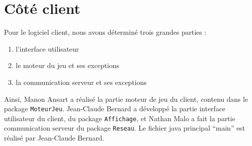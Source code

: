 \section{Côté client}
	Pour le logiciel client, nous avons déterminé trois grandes parties :
	\begin{enumerate}
		\item l'interface utilisateur
		\item le moteur du jeu et ses exceptions
		\item la communication serveur et ses exceptions
	\end{enumerate}

	Ainsi, Manon Ansart a réalisé la partie moteur de jeu du client, contenu dans le package \texttt{MoteurJeu}. Jean-Claude Bernard a développé la partie interface utilisateur du client, du package \texttt{Affichage}, et Nathan Malo a fait la partie communication serveur du package \texttt{Reseau}. Le fichier java principal \enquote{main} est réalisé par Jean-Claude Bernard.
